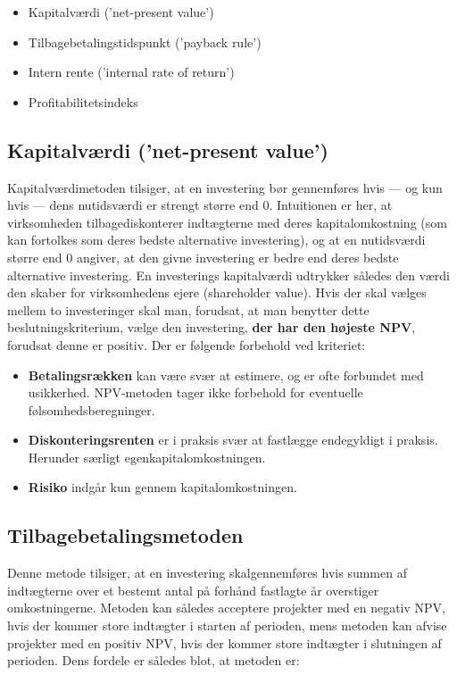 \documentclass[10pt,reqno, usenames]{article}
\begin{document}
\begin{itemize}
    \item Kapitalværdi ('net-present value')
    \item Tilbagebetalingstidspunkt ('payback rule')
    \item Intern rente ('internal rate of return')
    \item Profitabilitetsindeks
\end{itemize}

\subsection{Kapitalværdi ('net-present value')}
Kapitalværdimetoden tilsiger, at en investering bør gennemføres hvis — og kun hvis — dens nutidsværdi er strengt større end 0. Intuitionen er her, at virksomheden tilbagediskonterer indtægterne med deres kapitalomkostning (som kan fortolkes som deres bedste alternative investering), og at en nutidsværdi større end 0 angiver, at den givne investering er bedre end deres bedste alternative investering. En investerings kapitalværdi udtrykker således den værdi den skaber for virksomhedens ejere (shareholder value). Hvis der skal vælges mellem to investeringer skal man, forudsat, at man benytter dette beslutningskriterium, vælge den investering, \textbf{der har den højeste NPV}, forudsat denne er positiv. Der er følgende forbehold ved kriteriet: 

\begin{itemize}
    \item \textbf{Betalingsrækken} kan være svær at estimere, og er ofte forbundet med usikkerhed. NPV-metoden tager ikke forbehold for eventuelle følsomhedsberegninger. 
    \item \textbf{Diskonteringsrenten} er i praksis svær at fastlægge endegyldigt i praksis. Herunder særligt egenkapitalomkostningen. 
    \item \textbf{Risiko} indgår kun gennem kapitalomkostningen. 
\end{itemize}

\subsection{Tilbagebetalingsmetoden}
Denne metode tilsiger, at en investering skalgennemføres hvis summen af indtægterne over et bestemt antal på forhånd fastlagte år overstiger omkostningerne. Metoden kan således acceptere projekter med en negativ NPV, hvis der kommer store indtægter i starten af perioden, mens metoden kan afvise projekter med en positiv NPV, hvis der kommer store indtægter i slutningen af perioden. Dens fordele er således blot, at metoden er: 
\end{document}
